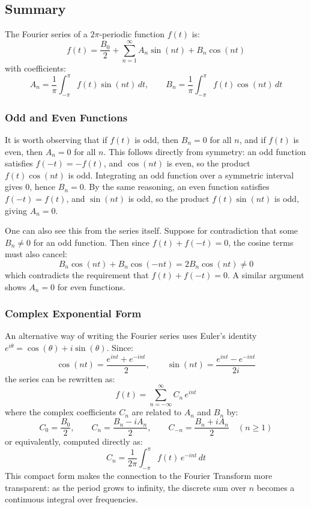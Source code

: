 \documentclass[]{article}
\begin{document}
\subsection{Summary}
The Fourier series of a $2\pi$-periodic function $f(t)$ is:
\[f(t) = \frac{B_0}{2} + \sum_{n=1}^{\infty} A_n \sin(nt) + B_n \cos(nt)\]
with coefficients:
\[A_n = \frac{1}{\pi}\int_{-\pi}^{\pi} f(t)\sin(nt)\,dt, \qquad B_n = \frac{1}{\pi}\int_{-\pi}^{\pi} f(t)\cos(nt)\,dt\]

\subsubsection*{Odd and Even Functions}
It is worth observing that if $f(t)$ is odd, then $B_n = 0$ for all $n$, and if $f(t)$ is even, then $A_n = 0$ for all $n$. This follows directly from symmetry: an odd function satisfies $f(-t) = -f(t)$, and $\cos(nt)$ is even, so the product $f(t)\cos(nt)$ is odd. Integrating an odd function over a symmetric interval gives $0$, hence $B_n = 0$. By the same reasoning, an even function satisfies $f(-t) = f(t)$, and $\sin(nt)$ is odd, so the product $f(t)\sin(nt)$ is odd, giving $A_n = 0$.

One can also see this from the series itself. Suppose for contradiction that some $B_n \neq 0$ for an odd function. Then since $f(t) + f(-t) = 0$, the cosine terms must also cancel:
\[B_n \cos(nt) + B_n \cos(-nt) = 2B_n\cos(nt) \neq 0\]
which contradicts the requirement that $f(t) + f(-t) = 0$. A similar argument shows $A_n = 0$ for even functions.

\subsubsection*{Complex Exponential Form}
An alternative way of writing the Fourier series uses Euler's identity $e^{i\theta} = \cos(\theta) + i\sin(\theta)$. Since:
\[\cos(nt) = \frac{e^{int} + e^{-int}}{2}, \qquad \sin(nt) = \frac{e^{int} - e^{-int}}{2i}\]
the series can be rewritten as:
\[f(t) = \sum_{n=-\infty}^{\infty} C_n \, e^{int}\]
where the complex coefficients $C_n$ are related to $A_n$ and $B_n$ by:
\[C_0 = \frac{B_0}{2}, \qquad C_n = \frac{B_n - iA_n}{2}, \qquad C_{-n} = \frac{B_n + iA_n}{2} \quad (n \geq 1)\]
or equivalently, computed directly as:
\[C_n = \frac{1}{2\pi}\int_{-\pi}^{\pi} f(t)\,e^{-int}\,dt\]
This compact form makes the connection to the Fourier Transform more transparent: as the period grows to infinity, the discrete sum over $n$ becomes a continuous integral over frequencies.
\end{document}
